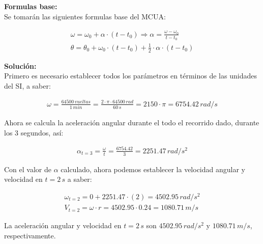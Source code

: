 \documentclass[11pt,letterpaper]{article}
\begin{document}
\textbf{Formulas base:}\\

Se tomarán las siguientes formulas base del MCUA:

\begin{align}
\boxed{ \omega = \omega_{0} + \alpha \cdot (t - t_{0})} \Rightarrow
\boxed{ \alpha = \frac{\omega - \omega_{0}}{t - t_{0}}}\\
\boxed{ \theta = \theta_{0} + \omega_{0} \cdot (t - t_{0}) + \frac{1}{2} \cdot \alpha \cdot (t - t_{0})}
\end{align}

\textbf{Solución:}\\

Primero es necesario establecer todos los parámetros en términos de las unidades del SI, a saber:

\begin{align}
\omega = \frac{64500\,vueltas}{1\,min} = \frac{2 \cdot \pi \cdot 64500\,rad}{60\,s} = 2150 \cdot \pi = 6754.42\,rad/s
\end{align}

Ahora se calcula la aceleración angular durante el todo el recorrido dado, durante los 3 segundos, así:

\begin{align}
\alpha_{t=3} = \frac{\omega}{t} = \frac{6754.42}{3} = 2251.47\,rad/s^2
\end{align}

Con el valor de $\alpha$ calculado, ahora podemos establecer la velocidad angular y velocidad en $t=2\,s$ a saber:

\begin{align}
\omega_{t=2} = 0 + 2251.47 \cdot (2) = 4502.95\,rad/s^2\\
V_{t=2} = \omega \cdot r = 4502.95 \cdot 0.24 = 1080.71\,m/s 
\end{align}

La aceleración angular y velocidad en $t = 2\,s$ son $4502.95\,rad/s^2$ y $1080.71\,m/s$, respectivamente.

\end{document}
